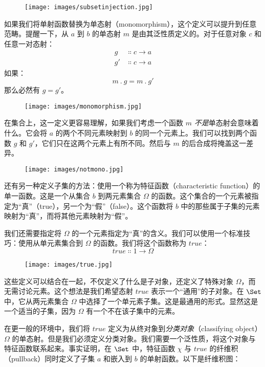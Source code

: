\begin{figure}[H]
  \centering
  \texttt{[image: images/subsetinjection.jpg]}
\end{figure}

\noindent
如果我们将单射函数替换为单态射（monomorphism），这个定义可以提升到任意范畴。提醒一下，从 $a$ 到 $b$ 的单态射 $m$ 是由其泛性质定义的。对于任意对象 $c$ 和任意一对态射：
\begin{align*}
  g  & \Colon c \to a \\
  g' & \Colon c \to a
\end{align*}
如果：
\[m\ .\ g = m\ .\ g'\]
那么必然有 $g = g'$。

\begin{figure}[H]
  \centering
  \texttt{[image: images/monomorphism.jpg]}
\end{figure}

\noindent
在集合上，这一定义更容易理解，如果我们考虑一个函数 $m$ \emph{不是}单态射会意味着什么。它会将 $a$ 的两个不同元素映射到 $b$ 的同一个元素上。我们可以找到两个函数 $g$ 和 $g'$，它们只在这两个元素上有所不同。然后与 $m$ 的后合成将掩盖这一差异。

\begin{figure}[H]
  \centering
  \texttt{[image: images/notmono.jpg]}
\end{figure}

\noindent
还有另一种定义子集的方法：使用一个称为特征函数（characteristic function）的单一函数。这是一个从集合 $b$ 到两元素集合 $\Omega$ 的函数。这个集合的一个元素被指定为``真''（true），另一个为``假''（false）。这个函数将 $b$ 中的那些属于子集的元素映射为``真''，而将其他元素映射为``假''。

我们还需要指定将 $\Omega$ 的一个元素指定为``真''的含义。我们可以使用一个标准技巧：使用从单元素集合到 $\Omega$ 的函数。我们将这个函数称为 $\mathit{true}$：
\[\mathit{true} \Colon 1 \to \Omega\]

\begin{figure}[H]
  \centering
  \texttt{[image: images/true.jpg]}
\end{figure}

\noindent
这些定义可以结合在一起，不仅定义了什么是子对象，还定义了特殊对象 $\Omega$，而无需讨论元素。这个想法是我们希望态射 $\mathit{true}$ 表示一个``通用''的子对象。在 $\Set$ 中，它从两元素集合 $\Omega$ 中选择了一个单元素子集。这是最通用的形式。显然这是一个适当的子集，因为 $\Omega$ 有一个不在该子集中的元素。

在更一般的环境中，我们将 $\mathit{true}$ 定义为从终对象到\emph{分类对象}（classifying object）$\Omega$ 的单态射。但是我们必须定义分类对象。我们需要一个泛性质，将这个对象与特征函数联系起来。事实证明，在 $\Set$ 中，特征函数 $\chi$ 与 $\mathit{true}$ 的纤维积（pullback）同时定义了子集 $a$ 和嵌入到 $b$ 的单射函数。以下是纤维积图：


